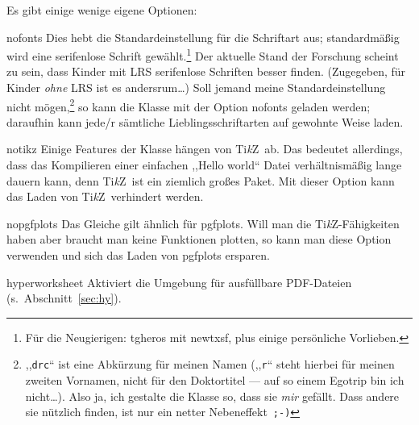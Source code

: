 \documentclass[hyperworksheet]{drcschool}
\newcommand*{\pkg}[1]{\textup{\ttfamily#1}}                                %
\newcommand*{\opt}[1]{\textup{\ttfamily#1}}                                %
\newcommand*{\TikZ}{\textup{Ti\textit{k}Z}}                                %
\begin{document}
Es gibt einige wenige eigene Optionen:
\begin{compactdesc}
\item[\opt{nofonts}] Dies hebt die Standardeinstellung für die
   Schriftart aus; standardmäßig wird eine serifenlose Schrift gewählt.\footnote{%
      Für die Neugierigen: \pkg{tgheros} mit \pkg{newtxsf}, plus einige persönliche Vorlieben.}
   Der aktuelle Stand der Forschung scheint zu sein, dass Kinder mit LRS serifenlose
   Schriften besser finden. (Zugegeben, für Kinder \emph{ohne} LRS ist es andersrum\ldots)
   Soll jemand meine Standardeinstellung nicht mögen,\footnote{%
      ,,\texttt{drc}`` ist eine Abkürzung für meinen Namen (,,\texttt{r}`` steht hierbei
      für meinen zweiten Vornamen, nicht für den Doktortitel --- auf so einem Egotrip bin ich nicht\ldots).
      Also ja, ich gestalte die Klasse so, dass sie \emph{mir} gefällt.
      Dass andere sie nützlich finden, ist nur ein netter Nebeneffekt~\texttt{;-)}}
   so kann die Klasse mit der Option \opt{nofonts} geladen werden; daraufhin kann jede/r
   sämtliche Lieblingsschriftarten auf gewohnte Weise laden.
\item[\opt{notikz}] Einige Features der Klasse hängen von \TikZ\ ab. Das bedeutet allerdings,
   dass das Kompilieren einer einfachen ,,Hello world`` Datei verhältnismäßig lange dauern kann,
   denn \TikZ\ ist ein ziemlich großes Paket. Mit dieser Option kann das Laden von \TikZ\ verhindert werden.
\item[\opt{nopgfplots}] Das Gleiche gilt ähnlich für \pkg{pgfplots}. Will man die \TikZ-Fähigkeiten
   haben aber braucht man keine Funktionen plotten, so kann man diese Option verwenden
   und sich das Laden von \pkg{pgfplots} ersparen.
\item[\opt{hyperworksheet}] Aktiviert die Umgebung für ausfüllbare PDF-Dateien (s.~Abschnitt~\ref{sec:hy}).
\end{compactdesc}
\end{document}
